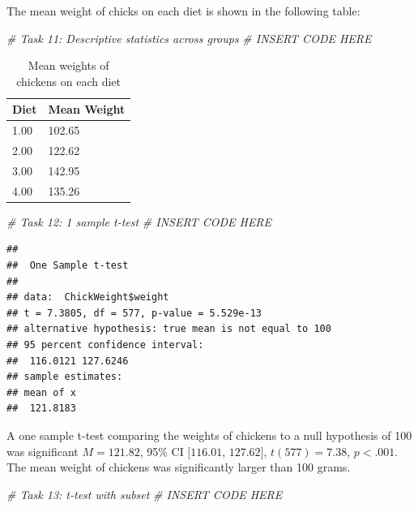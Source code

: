 \documentclass[english,man]{apa6}
\newenvironment{Shaded}{\begin{snugshade}}{\end{snugshade}}
\newcommand{\CommentTok}[1]{\textcolor[rgb]{0.56,0.35,0.01}{\textit{{#1}}}}
\begin{document}
The mean weight of chicks on each diet is shown in the following table:

\begin{Shaded}
\begin{Highlighting}[]
\CommentTok{# Task 11: Descriptive statistics across groups}
\CommentTok{# INSERT CODE HERE}
\end{Highlighting}
\end{Shaded}

\begin{table}[tbp]
\begin{center}
\begin{threeparttable}
\caption{\label{tab:unnamed-chunk-24}Mean weights of chickens on each diet}
\begin{tabular}{ll}
\toprule
Diet & \multicolumn{1}{c}{Mean Weight}\\
\midrule
1.00 & 102.65\\
2.00 & 122.62\\
3.00 & 142.95\\
4.00 & 135.26\\
\bottomrule
\end{tabular}
\end{threeparttable}
\end{center}
\end{table}

\begin{Shaded}
\begin{Highlighting}[]
\CommentTok{# Task 12: 1 sample t-test}
\CommentTok{# INSERT CODE HERE}
\end{Highlighting}
\end{Shaded}

\begin{verbatim}
## 
##  One Sample t-test
## 
## data:  ChickWeight$weight
## t = 7.3805, df = 577, p-value = 5.529e-13
## alternative hypothesis: true mean is not equal to 100
## 95 percent confidence interval:
##  116.0121 127.6246
## sample estimates:
## mean of x 
##  121.8183
\end{verbatim}

A one sample t-test comparing the weights of chickens to a null
hypothesis of 100 was significant \(M = 121.82\), 95\% CI \([116.01\),
\(127.62]\), \(t(577) = 7.38\), \(p < .001\). The mean weight of
chickens was significantly larger than 100 grams.

\begin{Shaded}
\begin{Highlighting}[]
\CommentTok{# Task 13: t-test with subset}
\CommentTok{# INSERT CODE HERE}
\end{Highlighting}
\end{Shaded}
\end{document}
